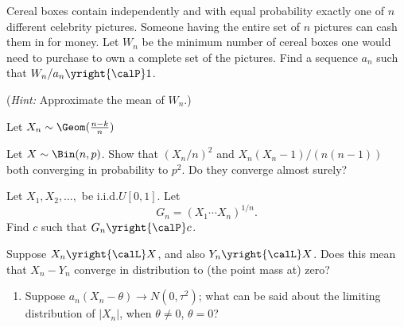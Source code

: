 \begin{problem}
  Cereal boxes contain independently and with equal probability exactly one
  of \(n\) different celebrity pictures. Someone having the entire set of
  \(n\) pictures can cash them in for money. Let \(W_n\) be the minimum
  number of cereal boxes one would need to purchase to own a complete set
  of the pictures. Find a sequence \(a_n\) such that
  \(W_n/a_n\yright{\calP} 1\).

  \noindent (\emph{Hint:} Approximate the mean of \(W_n\).)
\end{problem}
\begin{solution}
  Let \(X_n\sim\Geom(\frac{n-k}{n})\)
\end{solution}
\newpage

\begin{problem}[DasGupta 7.17]
  Let \(X\sim\Bin(n,p)\). Show that \((X_n/n)^2\) and
  \(X_n(X_n-1)/(n(n-1))\) both converging in probability to \(p^2\). Do
  they converge almost surely?
\end{problem}
\begin{solution}

\end{solution}
\newpage

\begin{problem}[DasGupta 7.21]
  Let \(X_1,X_2,\dotsc,\) be i.i.d.\@ \(U[0,1]\). Let
  \[
    G_n=(X_1\dotsm X_n)^{1/n}.
  \]
  Find \(c\) such that \(G_n\yright{\calP} c\).
\end{problem}
\begin{solution}

\end{solution}
\newpage

\begin{problem}
  Suppose \(X_n\yright{\calL}X\), and also \(Y_n\yright{\calL} X\). Does
  this mean that \(X_n-Y_n\) converge in distribution to (the point mass
  at) zero?
\end{problem}
\begin{solution}

\end{solution}
\newpage

\begin{problem}[DasGupta 7.31 (a)]
  \begin{enumerate}[label=(\alph*),noitemsep]
  \item Suppose \(a_n(X_n-\theta)\to N(0,\tau^2)\); what can be said
    about the limiting distribution of \(|X_n|\), when \(\theta\neq 0\),
    \(\theta=0\)?
  \end{enumerate}
\end{problem}
\begin{solution}

\end{solution}

